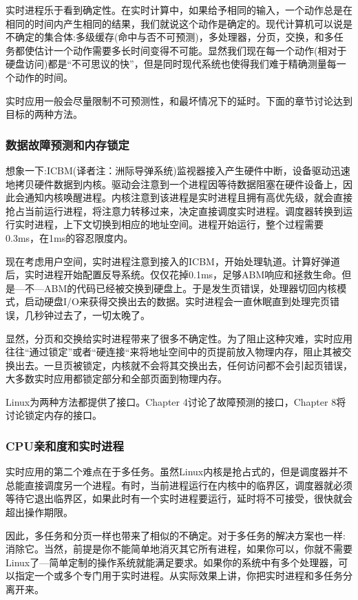   实时进程乐于看到确定性。在实时计算中，如果给予相同的输入，一个动作总是在相同的时间内产生相同的结果，我们就说这个动作是确定的。现代计算机可以说是不确定的集合体:多级缓存(命中与否不可预测)，多处理器，分页，交换，和多任务都使估计一个动作需要多长时间变得不可能。显然我们现在每一个动作(相对于硬盘访问)都是“不可思议的快”，但是同时现代系统也使得我们难于精确测量每一个动作的时间。

  实时应用一般会尽量限制不可预测性，和最坏情况下的延时。下面的章节讨论达到目标的两种方法。

\subsubsection{数据故障预测和内存锁定}

  想象一下:ICBM(译者注：洲际导弹系统)监视器接入产生硬件中断，设备驱动迅速地拷贝硬件数据到内核。驱动会注意到一个进程因等待数据阻塞在硬件设备上，因此会通知内核唤醒进程。内核注意到该进程是实时进程且拥有高优先级，就会直接抢占当前运行进程，将注意力转移过来，决定直接调度实时进程。调度器转换到运行实时进程，上下文切换到相应的地址空间。进程开始运行，整个过程需要0.3ms，在1ms的容忍限度内。

  现在考虑用户空间，实时进程注意到接入的ICBM，开始处理轨道。计算好弹道后，实时进程开始配置反导系统。仅仅花掉0.1ms，足够ABM响应和拯救生命。但是---不---ABM的代码已经被交换到硬盘上。于是发生页错误，处理器切回内核模式，启动硬盘I/O来获得交换出去的数据。实时进程会一直休眠直到处理完页错误，几秒钟过去了，一切太晚了。

  显然，分页和交换给实时进程带来了很多不确定性。为了阻止这种灾难，实时应用往往“通过锁定”或者“硬连接“来将地址空间中的页提前放入物理内存，阻止其被交换出去。一旦页被锁定，内核就不会将其交换出去，任何访问都不会引起页错误，大多数实时应用都锁定部分和全部页面到物理内存。

  Linux为两种方法都提供了接口。Chapter 4讨论了故障预测的接口，Chapter 8将讨论锁定内存的接口。

\subsubsection{CPU亲和度和实时进程}

  实时应用的第二个难点在于多任务。虽然Linux内核是抢占式的，但是调度器并不总能直接调度另一个进程。有时，当前进程运行在内核中的临界区，调度器就必须等待它退出临界区，如果此时有一个实时进程要运行，延时将不可接受，很快就会超出操作期限。

  因此，多任务和分页一样也带来了相似的不确定。对于多任务的解决方案也一样:消除它。当然，前提是你不能简单地消灭其它所有进程，如果你可以，你就不需要Linux了---简单定制的操作系统就能满足要求。如果你的系统中有多个处理器，可以指定一个或多个专门用于实时进程。从实际效果上讲，你把实时进程和多任务分离开来。

